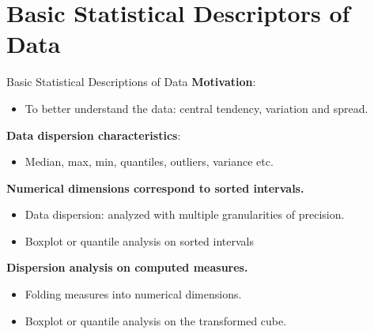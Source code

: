 \section{Basic Statistical Descriptors of Data}

\begin{frame}{Basic Statistical Descriptions of Data}
	\textbf{Motivation}:
	\begin{itemize}
		\item To better understand the data: central tendency, variation and spread.
	\end{itemize}

	\textbf{Data dispersion characteristics}:
	\begin{itemize}
		\item Median, max, min, quantiles, outliers, variance etc.
	\end{itemize}

	\textbf{Numerical dimensions correspond to sorted intervals.}\\
	\begin{itemize}
		\item Data dispersion: analyzed with multiple granularities of precision.
		\item Boxplot or quantile analysis on sorted intervals
	\end{itemize}

	\textbf{Dispersion analysis on computed measures.}\\
	\begin{itemize}
		\item Folding measures into numerical dimensions.
		\item Boxplot or quantile analysis on the transformed cube.
	\end{itemize}
\end{frame}

